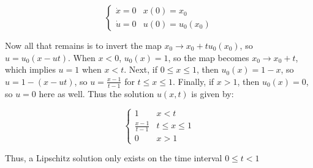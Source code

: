 \documentclass{article}
\begin{document}
    \[ \begin{cases}
        \dot{x} = 0 & x(0) = x_0 \\
        \dot{u} = 0 & u(0) = u_0(x_0)
    \end{cases}\]

    Now all that remains is to invert the map $x_0 \to x_0 + tu_0(x_0)$, so $u = u_0(x - ut)$. When $x < 0$, $u_0(x) = 1$, so the map becomes $x_0 \to x_0 + t$, which implies $u = 1$ when $x < t$.
    Next, if $0 \leq x \leq 1$, then $u_0(x) = 1-x$, so $u = 1-(x-ut)$, so $u = \frac{x-1}{t-1}$ for $t \leq x \leq 1$. Finally, if $x > 1$, then $u_0(x) = 0$, so $u = 0$ here as well. Thus the 
    solution $u(x, t)$ is given by:

    \[
        \begin{cases}
            1 & x < t \\
            \frac{x-1}{t-1} & t \leq x \leq 1 \\
            0 & x > 1
        \end{cases}
    \]

    Thus, a Lipschitz solution only exists on the time interval $0 \leq t < 1$
\end{document}
